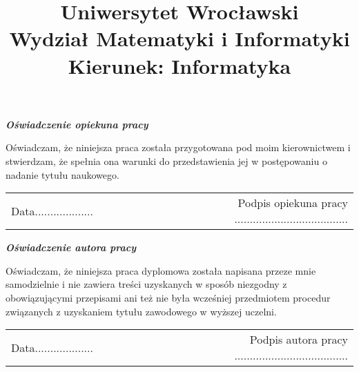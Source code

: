 \documentclass[12pt]{article}
\title{\LARGE{Uniwersytet Wrocławski}\\
\Large{Wydział Matematyki i Informatyki}\\
\large{Kierunek: Informatyka}}
\date{}
\begin{document}
\pagestyle{empty}

\textcolor{white}{  }
\begin{center}
\vspace{50pt}
\textbf{\emph{Oświadczenie opiekuna pracy}}\\
\end{center}
Oświadczam, że niniejsza praca została przygotowana pod moim kierownictwem i stwierdzam, że spełnia ona warunki do przedstawienia jej w postępowaniu o nadanie tytułu naukowego.\\

\vspace{54pt}

\begin{tabular}{lccccccccr}
Data................... & & & & & & & & & Podpis opiekuna pracy ..................................... \\
\end{tabular}


\vspace{150pt}

\begin{center}
\textbf{\emph{Oświadczenie autora pracy}}\\
\end{center}
Oświadczam, że niniejsza praca dyplomowa została napisana przeze mnie samodzielnie i nie zawiera treści uzyskanych w sposób niezgodny z obowiązującymi przepisami ani też nie była wcześniej przedmiotem procedur związanych z uzyskaniem tytułu zawodowego w wyższej uczelni.\\

\vspace{54pt}

\begin{tabular}{lccccccccr}
Data................... & & & & & & & & & Podpis autora pracy ..................................... \\
\end{tabular}
\end{document}
